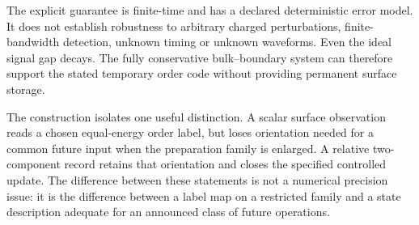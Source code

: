 \documentclass[11pt,a4paper]{article}
\theoremstyle{remark}
\begin{document}
The explicit guarantee is finite-time and has a declared deterministic
error model. It does not establish robustness to arbitrary charged
perturbations, finite-bandwidth detection, unknown timing or unknown
waveforms. Even the ideal signal gap decays. The fully conservative
bulk--boundary system can therefore support the stated temporary order
code without providing permanent surface storage.

The construction isolates one useful distinction. A scalar surface
observation reads a chosen equal-energy order label, but loses orientation
needed for a common future input when the preparation family is enlarged.
A relative two-component record retains that orientation and closes the
specified controlled update. The difference between these statements is
not a numerical precision issue: it is the difference between a label
map on a restricted family and a state description adequate for an
announced class of future operations.


\end{document}
